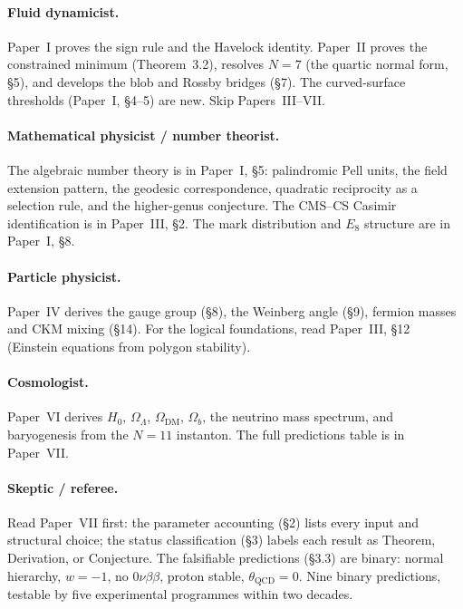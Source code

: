 \paragraph{Fluid dynamicist.}
Paper~I proves the sign rule and the Havelock identity.
Paper~II proves the constrained minimum (Theorem~3.2),
resolves $N = 7$ (the quartic normal form, \S5),
and develops the blob and Rossby bridges (\S7).
The curved-surface thresholds (Paper~I, \S4--5) are new.
Skip Papers~III--VII.

\paragraph{Mathematical physicist / number theorist.}
The algebraic number theory is in Paper~I, \S5:
palindromic Pell units, the field extension pattern,
the geodesic correspondence, quadratic reciprocity
as a selection rule, and the higher-genus conjecture.
The CMS--CS Casimir identification is in Paper~III, \S2.
The mark distribution and $E_8$ structure are in Paper~I, \S8.

\paragraph{Particle physicist.}
Paper~IV derives the gauge group (\S8), the Weinberg angle
(\S9), fermion masses and CKM mixing (\S14).
For the logical foundations, read Paper~III, \S12
(Einstein equations from polygon stability).

\paragraph{Cosmologist.}
Paper~VI derives $H_0$, $\Omega_\Lambda$, $\Omega_{\mathrm{DM}}$,
$\Omega_b$, the neutrino mass spectrum, and baryogenesis from
the $N = 11$ instanton.
The full predictions table is in Paper~VII.

\paragraph{Skeptic / referee.}
Read Paper~VII first: the parameter accounting (\S2) lists
every input and structural choice; the status classification
(\S3) labels each result as Theorem, Derivation, or Conjecture.
The falsifiable predictions (\S3.3) are binary: normal hierarchy,
$w = -1$, no $0\nu\beta\beta$, proton stable,
$\theta_{\mathrm{QCD}} = 0$.
Nine binary predictions, testable by five experimental
programmes within two decades.

